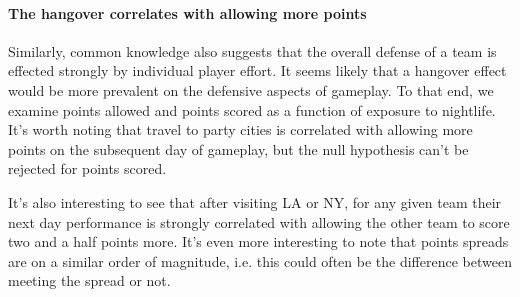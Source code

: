 \documentclass[letterpaper,12pt]{article}
\begin{document}
\paragraph{The hangover correlates with allowing more points}
Similarly, common knowledge also suggests that the overall defense of a team
is effected strongly by individual player effort. It seems likely that a hangover effect
would be more prevalent on the defensive aspects of gameplay. To that end, we examine points allowed and points scored as a function of exposure to nightlife.
It's worth noting that travel to party cities is correlated with allowing
more points on the subsequent day of gameplay, but the null hypothesis
can't be rejected for points scored.

It's also interesting to see that after visiting LA or NY, for any given
team their next day performance is strongly correlated with allowing the other team to
score two and a half points more. 
It's even more interesting to note that points spreads are on a similar order of magnitude,  
i.e. this could often be the difference between meeting the spread or not.
\end{document}
